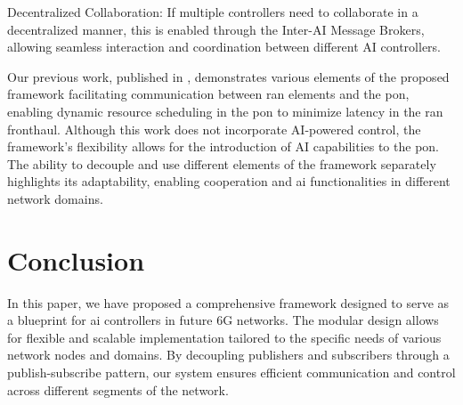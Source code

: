 Decentralized Collaboration: If multiple controllers need to collaborate in a decentralized manner, this is enabled through the Inter-AI Message Brokers, allowing seamless interaction and coordination between different AI controllers.

Our previous work, published in \cite{slyne2024demonstration}, demonstrates various elements of the proposed framework facilitating communication between \ac{ran} elements and the \ac{pon}, enabling dynamic resource scheduling in the \ac{pon} to minimize latency in the \ac{ran} fronthaul. Although this work does not incorporate AI-powered control, the framework's flexibility allows for the introduction of AI capabilities to the \ac{pon}. The ability to decouple and use different elements of the framework separately highlights its adaptability, enabling cooperation and \ac{ai} functionalities in different network domains. 

\section{Conclusion}
In this paper, we have proposed a comprehensive framework designed to serve as a blueprint for \ac{ai} controllers in future 6G networks. The modular design allows for flexible and scalable implementation tailored to the specific needs of various network nodes and domains. By decoupling publishers and subscribers through a publish-subscribe pattern, our system ensures efficient communication and control across different segments of the network.

